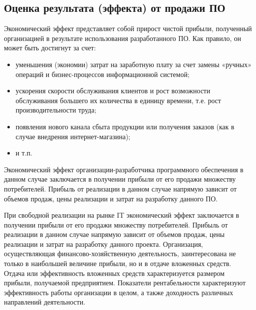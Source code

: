 \subsection{Оценка результата (эффекта) от продажи ПО}
\label{sub:econ:evaluation_result}

Экономический эффект представляет собой прирост чистой прибыли,
полученный организацией в результате использования разработанного ПО. Как правило, он может быть достигнут за счет:

\begin{itemize}
\item уменьшения (экономии) затрат на заработную плату за счет замены «ручных» операций и бизнес-процессов информационной системой;
\item ускорения скорости обслуживания клиентов и рост возможности обслуживания большего их количества в единицу времени, т.е. рост производительности труда;
\item появления нового канала сбыта продукции или получения заказов (как в случае внедрения интернет-магазина);
\item и т.п.
\end{itemize}

Экономический эффект организации-разработчика программного обеспечения в данном случае заключается в получении прибыли от его продажи множеству потребителей. Прибыль от реализации в данном случае напрямую зависит от объемов продаж, цены реализации и затрат на разработку данного ПО.

При свободной реализации на рынке IT экономический эффект заключается в получении прибыли от его продажи множеству потребителей. Прибыль от реализации в данном случае напрямую зависит от объемов продаж, цены реализации и затрат на разработку данного проекта. Организация, осуществляющая финансово-хозяйственную деятельность, заинтересована не только в наибольшей величине прибыли, но и в отдаче вложенных средств. Отдача или эффективность вложенных средств характеризуется размером прибыли, получаемой предприятием. Показатели рентабельности характеризуют эффективность работы организации в целом, а также доходность различных направлений деятельности.

